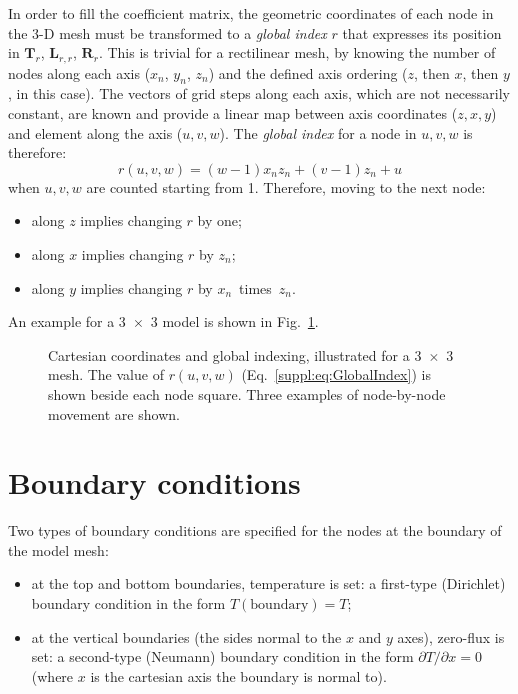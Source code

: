 In order to fill the coefficient matrix, the geometric coordinates of each node in the 3-D mesh must be transformed to a \textit{global index} $r$ that expresses its position in $\bm{T}_r$, $\bm{L}_{r,r}$, $\bm{R}_r$.
This is trivial for a rectilinear mesh, by knowing the number of nodes along each axis ($x_n$, $y_n$, $z_n$) and the defined axis ordering ($z$, then $x$, then $y$, in this case).
The vectors of grid steps along each axis, which are not necessarily constant, are known and provide a linear map between axis coordinates ($z,x,y$) and element along the axis ($u,v,w$).
The \textit{global index} for a node in $u,v,w$ is therefore:
\begin{equation}
    \label{suppl:eq:GlobalIndex}
    r(u,v,w) = (w-1) x_n z_n + (v-1) z_n + u
\end{equation}
when $u,v,w$ are counted starting from \num{1}.
Therefore, moving to the next node:
\begin{itemize}
    \item along $z$ implies changing $r$ by one;
    \item along $x$ implies changing $r$ by $z_n$;
    \item along $y$ implies changing $r$ by $x_n$~times~$z_n$.
\end{itemize}
An example for a 3~$\times$~3 model is shown in Fig.~\ref{suppl:fig:GridIndexing}.

\begin{figure}
    \begin{adjustbox}{center}
    \end{adjustbox}
    \caption[Cartesian coordinates and global indexing on a 3~$\times$~3 mesh.]{Cartesian coordinates and global indexing, illustrated for a 3~$\times$~3 mesh. The value of $r(u,v,w)$ (Eq.~\ref{suppl:eq:GlobalIndex}) is shown beside each node square. Three examples of node-by-node movement are shown.}
    \label{suppl:fig:GridIndexing}
\end{figure}

\FloatBarrier

\section{Boundary conditions}
\label{s:ThermModel:FD_BoundaryConditions}
Two types of boundary conditions are specified for the nodes at the boundary of the model mesh:
\begin{itemize}
    \item at the top and bottom boundaries, temperature is set: a first-type (Dirichlet) boundary condition in the form $T(\mathrm{boundary}) = T$;
    \item at the vertical boundaries (the sides normal to the $x$ and $y$ axes), zero-flux is set: a second-type (Neumann) boundary condition in the form $\partial T / \partial x = 0$ (where $x$ is the cartesian axis the boundary is normal to).
\end{itemize}

